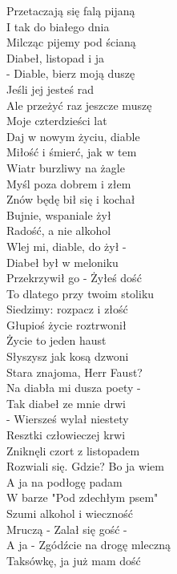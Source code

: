 Przetaczają się falą pijaną \\
I tak do białego dnia \\
Milcząc pijemy pod ścianą \\
Diabeł, listopad i ja \\
\newpage
- Diable, bierz moją duszę \\
Jeśli jej jesteś rad \\
Ale przeżyć raz jeszcze muszę \\
Moje czterdzieści lat \\
Daj w nowym życiu, diable \\
Miłość i śmierć, jak w tem \\
Wiatr burzliwy na żagle \\
Myśl poza dobrem i złem \\
\hops
Znów będę bił się i kochał \\
Bujnie, wspaniale żył \\
Radość, a nie alkohol \\
Wlej mi, diable, do żył - \\
Diabeł był w meloniku \\
Przekrzywił go - Żyłeś dość \\
To dlatego przy twoim stoliku \\
Siedzimy: rozpacz i złość \\
\hops
Głupioś życie roztrwonił \\
Życie to jeden haust \\
Słyszysz jak kosą dzwoni  \\
Stara znajoma, Herr Faust? \\
Na diabła mi dusza poety - \\
Tak diabeł ze mnie drwi \\
- Wiersześ wylał niestety \\
Resztki człowieczej krwi \\
\hops
Zniknęli czort z listopadem \\
Rozwiali się. Gdzie? Bo ja wiem \\
A ja na podłogę padam \\
W barze "Pod zdechłym psem" \\
Szumi alkohol i wieczność \\
Mruczą - Zalał się gość - \\
A ja - Zgódźcie na drogę mleczną \\
Taksówkę, ja już mam dość